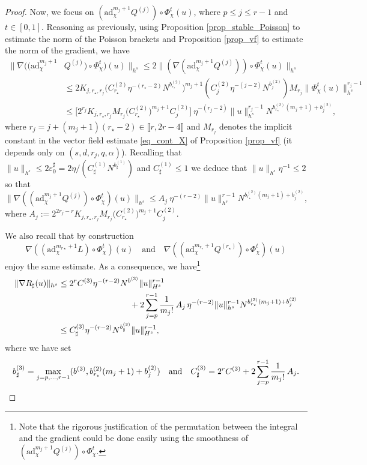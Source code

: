 \begin{proof}
Now, we focus on $(\mathrm{ad}_{\chi}^{m_j+1} Q^{(j)}) \circ \Phi_\chi^t(u) $, where $p\leq j \leq r-1$ and $t\in [0,1]$. Reasoning as previously, using Proposition \ref{prop_stable_Poisson} to estimate the norm of the Poisson brackets and Proposition \ref{prop_vf} to estimate the norm of the gradient, we have
\begin{equation*}
\begin{split}
\| \nabla ((\mathrm{ad}_{\chi}^{m_j+1} &Q^{(j)}) \circ \Phi_\chi^t)(u) \|_{h^s} \leq 2 \| (\nabla (\mathrm{ad}_{\chi}^{m_j+1} Q^{(j)}))\circ \Phi_\chi^t (u) \|_{h^s} \\
&\leq 2 K_{j,r_\star,r_j} \big(C_{r_\star}^{(2)} \eta^{-(r_\star-2)} N^{b_{r_\star}^{(2)}} \big)^{m_j+1} (C_{j}^{(2)} \eta^{-(j-2)} N^{b_{j}^{(2)}}) M_{r_j} \| \Phi_\chi^t (u) \|_{h^s}^{r_j-1} \\
&\leq \big[2^{r_j} K_{j,r_\star,r_j} M_{r_j} \big(C_{r_\star}^{(2)})^{m_j+1} C_{j}^{(2)} \big] \ \eta^{-(r_j -2)} \|u\|_{h^s}^{r_j-1} N^{b_{r_\star}^{(2)} (m_j+1) + b_{j}^{(2)} },
\end{split}
\end{equation*}
where $r_j = j+(m_j+1)(r_\star - 2) \in \llbracket r,2r-4\rrbracket$ and $M_{r_j}$ denotes the implicit constant in the vector field estimate \eqref{eq_cont_X} of Proposition \ref{prop_vf} (it depends only on $(s,d,r_j,q,\alpha)$).
Recall\-ing that $\| u \|_{h^s} \leq 2 \varepsilon_0^\sharp= 2 \eta/ (C^{(1)}_\sharp N^{b^{(1)}_\sharp})$ and $C^{(1)}_\sharp \leq 1 $ we deduce that $\| u \|_{h^s} \eta^{-1} \leq 2$ so that
\[
\| \nabla ((\mathrm{ad}_{\chi}^{m_j+1} Q^{(j)}) \circ \Phi_\chi^t)(u) \|_{h^s} \leq A_j \ \eta^{-(r -2)} \|u\|_{h^s}^{r-1} N^{b_{r_\star}^{(2)} (m_j+1) + b_{j}^{(2)} },
\]
where $A_j:= 2^{2r_j-r} K_{j,r_\star,r_j} M_{r_j} \big(C_{r_\star}^{(2)})^{m_j+1} C_{j}^{(2)}$.

We also recall that by construction
\[
\nabla ((\mathrm{ad}_{\chi}^{m_{r\star}+1} L) \circ \Phi_\chi^t)(u) \quad\text{and} \quad\nabla ((\mathrm{ad}_{\chi}^{m_{r_\star}+1} Q^{(r_\star)}) \circ \Phi_\chi^t)(u)
\]
enjoy the same estimate. As a consequence, we have\footnote{Note that the rigorous justification of the permutation between the integral and the gradient could be done easily using the smoothness of $(\mathrm{ad}_{\chi}^{m_j+1} Q^{(j)}) \circ \Phi_\chi^t$.}
\begin{equation*}
\begin{split}
\| \nabla R_\sharp(u) \|_{h^s} &\leq 2^r C^{(3)} \eta^{-(r-2)} N^{b^{(3)}} \| u \|_{H^s}^{r-1} \\
&\hspace*{3cm}+ 2\sum_{j=p}^{r-1} \frac1{m_j !}\, A_j \, \eta^{-(r -2)} \|u\|_{h^s}^{r-1} N^{b_{r_\star}^{(2)} (m_j+1) + b_{j}^{(2)} } \\
&\leq C^{(3)}_\sharp \eta^{-(r-2)} N^{b^{(3)}_\sharp} \|u\|_{H^s}^{r-1},
\end{split}
\end{equation*}
where we have set
\[
b^{(3)}_\sharp = \max_{j = p,\dots,r-1} (b^{(3)}, b_{r_\star}^{(2)} (m_j+1) + b_{j}^{(2)}) \quad \text{and} \quad C^{(3)}_\sharp = 2^r C^{(3)} + 2\sum_{j=p}^{r-1} \frac1{m_j !}\, A_j.\qedhere
\]
\end{proof}

